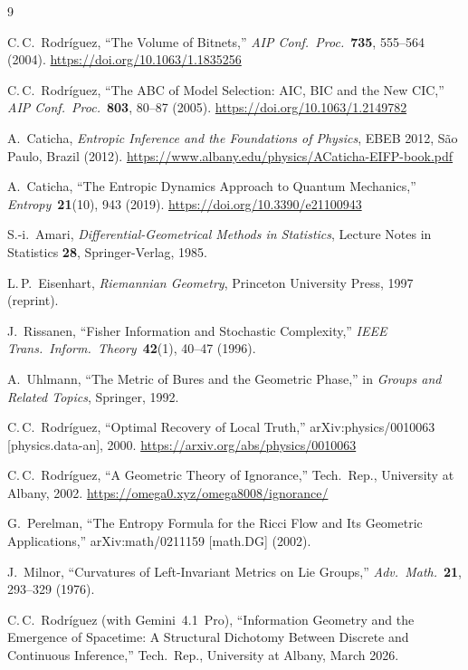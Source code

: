 \documentclass[11pt]{article}
\theoremstyle{definition}
\begin{document}
\begin{thebibliography}{9}

C.\,C.~Rodr\'iguez,
``The Volume of Bitnets,''
\textit{AIP Conf.\ Proc.}\ \textbf{735}, 555--564 (2004).
\url{https://doi.org/10.1063/1.1835256}

C.\,C.~Rodr\'iguez,
``The ABC of Model Selection: AIC, BIC and the New CIC,''
\textit{AIP Conf.\ Proc.}\ \textbf{803}, 80--87 (2005).
\url{https://doi.org/10.1063/1.2149782}

A.~Caticha,
\textit{Entropic Inference and the Foundations of Physics},
EBEB 2012, S\~ao Paulo, Brazil (2012).
\url{https://www.albany.edu/physics/ACaticha-EIFP-book.pdf}

A.~Caticha,
``The Entropic Dynamics Approach to Quantum Mechanics,''
\textit{Entropy}\ \textbf{21}(10), 943 (2019).
\url{https://doi.org/10.3390/e21100943}

S.-i.~Amari,
\textit{Differential-Geometrical Methods in Statistics},
Lecture Notes in Statistics \textbf{28},
Springer-Verlag, 1985.

L.\,P.~Eisenhart,
\textit{Riemannian Geometry},
Princeton University Press, 1997 (reprint).

J.~Rissanen,
``Fisher Information and Stochastic Complexity,''
\textit{IEEE Trans.\ Inform.\ Theory}\ \textbf{42}(1), 40--47 (1996).

A.~Uhlmann,
``The Metric of Bures and the Geometric Phase,''
in \textit{Groups and Related Topics}, Springer, 1992.

C.\,C.~Rodr\'iguez,
``Optimal Recovery of Local Truth,''
arXiv:physics/0010063 [physics.data-an], 2000.
\url{https://arxiv.org/abs/physics/0010063}

C.\,C.~Rodr\'iguez,
``A Geometric Theory of Ignorance,''
Tech.\ Rep., University at Albany, 2002.
\url{https://omega0.xyz/omega8008/ignorance/}

G.~Perelman,
``The Entropy Formula for the Ricci Flow and Its Geometric Applications,''
arXiv:math/0211159 [math.DG] (2002).

J.~Milnor,
``Curvatures of Left-Invariant Metrics on Lie Groups,''
\textit{Adv.\ Math.}\ \textbf{21}, 293--329 (1976).

C.\,C.~Rodr\'iguez (with Gemini~4.1~Pro),
``Information Geometry and the Emergence of Spacetime:
A Structural Dichotomy Between Discrete and Continuous Inference,''
Tech.\ Rep., University at Albany, March 2026.

\end{thebibliography}
\end{document}
